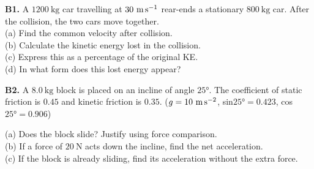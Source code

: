 \begin{exercisebox}[4]
\textbf{B1.} A $1200\ \text{kg}$ car travelling at
$30\ \text{m\,s}^{-1}$ rear-ends a stationary
$800\ \text{kg}$ car. After the collision, the two
cars move together.\\[4pt]
(a) Find the common velocity after collision.\\
(b) Calculate the kinetic energy lost in the collision.\\
(c) Express this as a percentage of the original KE.\\
(d) In what form does this lost energy appear?
\hfill{}

\vspace{0.4cm}

\textbf{B2.} A $8.0\ \text{kg}$ block is placed on an
incline of angle $25°$. The coefficient of static
friction is $0.45$ and kinetic friction is $0.35$.
($g = 10\ \text{m\,s}^{-2}$, sin$25° = 0.423$,
cos$25° = 0.906$)\\[4pt]
\begin{center}
\end{center}
(a) Does the block slide? Justify using force
comparison.\\
(b) If a force of $20\ \text{N}$ acts down the incline,
find the net acceleration.\\
(c) If the block is already sliding, find its
acceleration without the extra force.
\hfill{}

\vspace{0.4cm}


\end{exercisebox}
